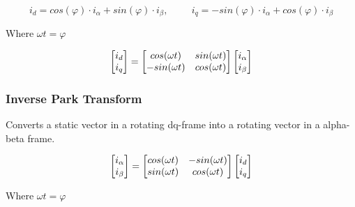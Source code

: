 \begin{equation}
    i_{d} = cos(\varphi) \cdot i_{\alpha} + sin(\varphi) \cdot i_{\beta}
    , \hspace{1cm}
    i_{q} = -sin(\varphi) \cdot i_{\alpha} + cos(\varphi) \cdot i_{\beta}
    \label{eq:park_transformation}
\end{equation}

Where
$\omega t = \varphi$

\begin{equation}
    \centering
    \begin{bmatrix}
        i_{d} \\ 
        i_{q}
    \end{bmatrix}
    =
    \begin{bmatrix}
       cos(\omega t) & sin(\omega t) \\
       -sin(\omega t) & cos(\omega t)
    \end{bmatrix}
    \begin{bmatrix}
        i_{\alpha} \\ 
        i_{\beta}
    \end{bmatrix}
\end{equation}





\subsubsection{Inverse Park Transform}
Converts a static vector in a rotating dq-frame into a rotating vector in a alpha-beta frame.

\begin{equation}
    \centering
    \begin{bmatrix}
        i_{\alpha} \\ 
        i_{\beta}
    \end{bmatrix}
    =
    \begin{bmatrix}
       cos(\omega t) & -sin(\omega t) \\
       sin(\omega t) & cos(\omega t)
    \end{bmatrix}
    \begin{bmatrix}
        i_{d} \\ 
        i_{q}
    \end{bmatrix}
\end{equation}

Where
$\omega t = \varphi$

